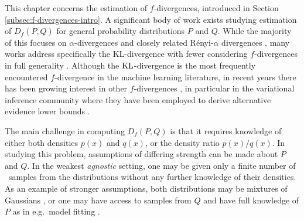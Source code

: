 This chapter concerns the estimation of $f$-divergences, introduced in Section \ref{subsec:f-divergences-intro}.
A significant body of work exists studying estimation of $D_f(P , Q)$ for general probability distributions $P$ and $Q$.
While the majority of this focuses on $\alpha$-divergences and closely related R\'enyi-$\alpha$ divergences \citep{poczos11alpha, singh14alpha, krishnamurthy14icml},
many works address specifically the KL-divergence \citep{perez08kl, wang09kl}
with fewer considering $f$-divergences in full generality \citep{nguyen10ratio, kanamori12ratio, moon14ensemble, moon14followup}.
Although the $\mathrm{KL}$-divergence is the most frequently encountered $f$-divergence in the machine learning literature, in recent years there has been growing interest in other $f$-divergences \citep{nowozin2016f,zhang2019variational}, 
in particular in the variational inference community where they have been employed to derive alternative evidence lower bounds \citep{li2016renyi, dieng2017variational, pmlr-v80-chen18k}.


The main challenge in computing $D_f(P , Q)$ is that it requires knowledge of either both densities $p(x)$ and $q(x)$, or the density ratio $p(x)/q(x)$.
In studying this problem, assumptions of differing strength can be made about $P$ and $Q$. 
In the weakest \emph{agnostic} setting, one may be given only a finite number of \iid~samples from the distributions without any further knowledge of their densities.
As an example of stronger assumptions,
both distributions may be mixtures of Gaussians \citep{hershey2007approximating, durrieu2012lower}, 
or one may have access to samples from $Q$ and have full knowledge of $P$ as in e.g.~model fitting \citep{heroma2001techrep, heroma2002ieee}.

